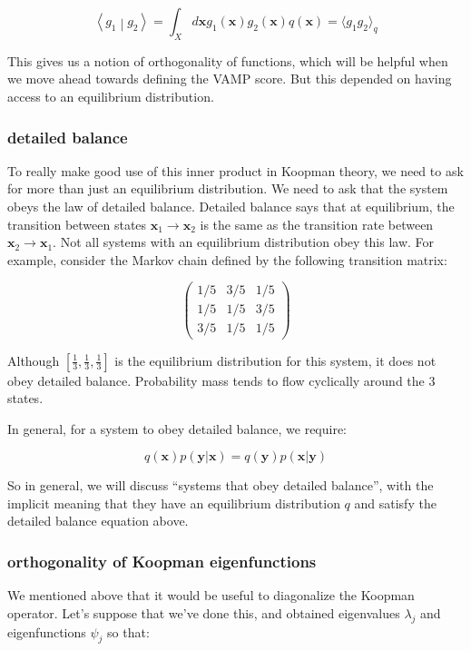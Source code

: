 \documentclass[]{article}
\newcommand{\braket}[2]{\left\langle #1 \middle| #2 \right\rangle}
\newcommand{\w}[1]{\mathbf{#1}}
\begin{document}
$$
\braket{g_1}{g_2} = \int_X d\w{x} g_1(\w{x}) g_2(\w{x}) q(\w{x}) = \langle g_1 g_2 \rangle_q
$$

This gives us a notion of orthogonality of functions, which will be helpful when we move ahead towards defining the VAMP score. But this depended on having access to an equilibrium distribution.

\subsubsection{detailed balance}

To really make good use of this inner product in Koopman theory, we need to ask for more than just an equilibrium distribution. We need to ask that the system obeys the law of detailed balance. Detailed balance says that at equilibrium, the transition between states $\w{x}_1\to \w{x}_2$ is the same as the transition rate between $\w{x}_2\to \w{x}_1$. Not all systems with an equilibrium distribution obey this law. For example, consider the Markov chain defined by the following transition matrix:

$$
\begin{pmatrix}
	1/5 & 3/5 & 1/5 \\
	1/5 & 1/5 & 3/5 \\
	3/5 & 1/5 & 1/5
\end{pmatrix}
$$

Although $[\frac{1}{3},\frac{1}{3},\frac{1}{3}]$ is the equilibrium distribution for this system, it does not obey detailed balance. Probability mass tends to flow cyclically around the 3 states.

In general, for a system to obey detailed balance, we require:

$$
q(\w{x})p(\w{y}|\w{x}) = q(\w{y})p(\w{x}|\w{y})
$$

So in general, we will discuss ``systems that obey detailed balance'', with the implicit meaning that they have an equilibrium distribution $q$ and satisfy the detailed balance equation above.

\subsubsection{orthogonality of Koopman eigenfunctions}


We mentioned above that it would be useful to diagonalize the Koopman operator. Let's suppose that we've done this, and obtained eigenvalues $\lambda_j$ and eigenfunctions $\psi_j$ so that:
\end{document}
